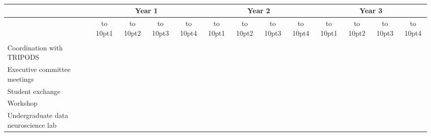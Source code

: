 \def\graycell{\cellcolor[RGB]{200,200,200}}
\def\acell{\cellcolor[rgb]{.98,.81,.69}}
\def\bcell{\cellcolor[rgb]{0.54, 0.81, 0.94}}
\def\ccell{\cellcolor[rgb]{0.98, 0.91, 0.71}}
\def\dcell{\cellcolor[rgb]{0.64, 0.76, 0.68}}
\def\ecell{\cellcolor[rgb]{0.96, 0.76, 0.76}}
\def\g{}
\def\g{\graycell}
\def\a{\acell}
\def\b{\bcell}
\def\c{\ccell}
\def\d{\dcell}
\def\e{\ecell}
\def\yale{\bcell}
\def\brown{\acell}
\def\both{\bcell}


\def\topic#1{\multicolumn{13}{c}{}\\
  \multicolumn{1}{l}{\bf #1 } & \multicolumn{12}{c}{} \\[3pt] \hline}
\def\numb#1{\hbox to 10pt{\hfill #1\hfill}}
\def\ffour{\numb{4}}
\def\three{\numb{3}}
\def\two{\numb{2}}
\def\one{\numb{1}}
\def\four{\multicolumn{1}{c|}{\ffour}}
\def\col{C}
\def\stan{S}
\def\rice{R}

\noindent
\begin{small}
\begin{center}
\mbox{\ }\vskip20pt
\setlength{\tabcolsep}{3pt}    
\renewcommand{\arraystretch}{1.2}
\begin{tabular}{|>{\arraybackslash}m{2.5in}|c|c|c|c||c|c|c|c||c|c|c|c|}
\hline 
\multirow{2}{*}{\small \bf Activity} & \multicolumn{4}{c}{\bf
  Year 1} \vline & \multicolumn{4}{c}{\bf Year 2} \vline &
\multicolumn{4}{c|}{\bf Year 3} \\[3pt] \cline{2-13}
& \one & \two & \three & \four & \one & \two & \three & \four & \one & \two & \three & \four \\ \hline


\multicolumn{13}{c}{}\\[-12pt]
\hline

Coordination with TRIPODS & & \brown & & & & \brown & & & & \brown & & \\ \hline
Executive committee meetings & \b & \b & \b & \b & \b & \b & \b & \b & \b & \b & \b & \b \\ \hline
Student exchange & & & \brown & & & & \yale & & & & \yale & \\ \hline
Workshop &  &  &  & \yale &  &  &  & \brown & & & & \brown \\ \hline
Undergraduate data neuroscience lab &  &  \yale &  & &  & \yale &  & & & \yale & & \\ \hline
\end{tabular}
\end{center}
\end{small}


